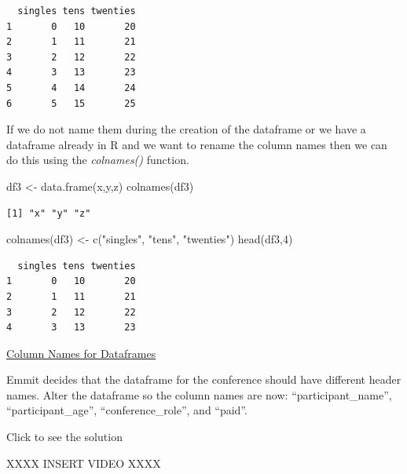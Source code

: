\documentclass[
  letterpaper,
  DIV=11,
  numbers=noendperiod]{scrreprt}
\newenvironment{Shaded}{\begin{snugshade}}{\end{snugshade}}
\newcommand{\DecValTok}[1]{\textcolor[rgb]{0.68,0.00,0.00}{#1}}
\newcommand{\FunctionTok}[1]{\textcolor[rgb]{0.28,0.35,0.67}{#1}}
\newcommand{\NormalTok}[1]{\textcolor[rgb]{0.00,0.23,0.31}{#1}}
\newcommand{\OtherTok}[1]{\textcolor[rgb]{0.00,0.23,0.31}{#1}}
\newcommand{\StringTok}[1]{\textcolor[rgb]{0.13,0.47,0.30}{#1}}
\begin{document}
\begin{verbatim}
  singles tens twenties
1       0   10       20
2       1   11       21
3       2   12       22
4       3   13       23
5       4   14       24
6       5   15       25
\end{verbatim}

If we do not name them during the creation of the dataframe or we have a
dataframe already in R and we want to rename the column names then we
can do this using the \emph{colnames()} function.

\begin{Shaded}
\begin{Highlighting}[]
\NormalTok{df3 }\OtherTok{\textless{}{-}} \FunctionTok{data.frame}\NormalTok{(x,y,z)}
\FunctionTok{colnames}\NormalTok{(df3)}
\end{Highlighting}
\end{Shaded}

\begin{verbatim}
[1] "x" "y" "z"
\end{verbatim}

\begin{Shaded}
\begin{Highlighting}[]
\FunctionTok{colnames}\NormalTok{(df3) }\OtherTok{\textless{}{-}} \FunctionTok{c}\NormalTok{(}\StringTok{"singles"}\NormalTok{, }\StringTok{"tens"}\NormalTok{, }\StringTok{"twenties"}\NormalTok{)}
\FunctionTok{head}\NormalTok{(df3,}\DecValTok{4}\NormalTok{)}
\end{Highlighting}
\end{Shaded}

\begin{verbatim}
  singles tens twenties
1       0   10       20
2       1   11       21
3       2   12       22
4       3   13       23
\end{verbatim}

\begin{watch}{}{}
    \href{https://youtu.be/jzJfkWANAMU}{Column Names for Dataframes}
\end{watch}

\begin{tcolorbox}[enhanced jigsaw, colframe=quarto-callout-tip-color-frame, colback=white, breakable, rightrule=.15mm, title=\textcolor{quarto-callout-tip-color}{\faLightbulb}\hspace{0.5em}{Try it Out}, bottomtitle=1mm, toptitle=1mm, titlerule=0mm, left=2mm, coltitle=black, colbacktitle=quarto-callout-tip-color!10!white, leftrule=.75mm, opacitybacktitle=0.6, bottomrule=.15mm, opacityback=0, arc=.35mm, toprule=.15mm]

Emmit decides that the dataframe for the conference should have
different header names. Alter the dataframe so the column names are now:
``participant\_name'', ``participant\_age'', ``conference\_role'', and
``paid''.

Click to see the solution

XXXX INSERT VIDEO XXXX

\end{tcolorbox}
\end{document}

